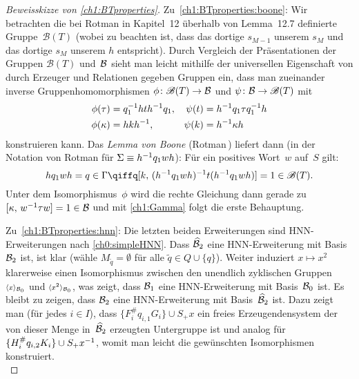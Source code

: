 \begin{proof}[Beweisskizze von \cref{ch1:BTproperties}]
    Zu~\ref{ch1:BTproperties:boone}: Wir betrachten die bei Rotman 
    in Kapitel~12 überhalb von Lemma~12.7 definierte Gruppe~$\mathscr{B}(T)$
    (wobei zu beachten ist, dass das dortige $s_{M-1}$ unserem $s_M$
    und das dortige $s_M$ unserem $h$ entspricht).
    Durch Vergleich der Präsentationen der Gruppen $\mathscr{B}(T)$
    und~$\mathcal{B}$ sieht man leicht mithilfe der universellen Eigenschaft
    von durch Erzeuger und Relationen gegeben Gruppen ein, dass man
    zueinander inverse Gruppenhomomorphismen $\phi\colon\mathscr{B}(T)
    \to\mathcal{B}$ und $\psi\colon\mathcal{B}\to\mathscr{B}(T)$ mit
    \begin{align*}
        \phi(\tau)   &= q_1^{-1} hth^{-1} q_1
        ,&
        \psi(t)      &= h^{-1} q_1\tau q_1^{-1} h
        \\
        \phi(\kappa) &= hkh^{-1}
        ,&
        \psi(k)      &= h^{-1}\kappa h
    \end{align*}
    konstruieren kann. Das \emph{Lemma von Boone}
    (Rotman\,\cite[Lemma~12.7]{bookc:rotman95}) liefert dann
    (in der Notation von Rotman für $\Sigma \equiv h^{-1} q_1wh$):
    Für ein positives Wort~$w$ auf~$S$ gilt:
    \[ hq_1wh = q \in\Gamma
        \qiffq
        \cu[k, (h\inv q_1wh)\inv t (h\inv q_1wh)] = 1
        \in\mathscr{B}(T)
    . \]
    Unter dem Isomorphismus~$\phi$ wird die rechte Gleichung
    dann gerade zu $\cu[\kappa, w\inv\tau w] = 1 \in\BT$
    und mit \cref{ch1:Gamma} folgt die erste Behauptung.
    
    Zu~\ref{ch1:BTproperties:hnn}: Die letzten beiden Erweiterungen
    sind HNN-Erweiterungen nach \cref{ch0:simpleHNN}. Dass $\widehat{\mathcal{B}}_2$
    eine HNN-Erweiterung mit Basis~$\mathcal{B}_2$ ist, ist klar (wähle
    $M_{\tilde q} = \emptyset$ für alle $\tilde q\in Q\cup\{q\}$).
    Weiter induziert $x\mapsto x^2$ klarerweise einen Isomorphismus
    zwischen den unendlich zyklischen Gruppen $\scriptstyle\langle x\rangle_{\mathcal{B}_0}$
    und $\scriptstyle\langle x^2\rangle_{\mathcal{B}_0}$, was zeigt, dass $\mathcal{B}_1$ eine
    HNN-Erweiterung mit Basis~$\mathcal{B}_0$ ist. Es bleibt zu zeigen,
    dass $\mathcal{B}_2$ eine HNN-Erweiterung mit Basis~$\widehat{\mathcal{B}}_2$ ist.
    Dazu zeigt man (für jedes $i\in I$), dass $\{F_i^\#q_{i,1}G_i\}\cup
    S_+x$ ein freies Erzeugendensystem der von dieser Menge
    in~$\widehat{\mathcal{B}}_2$ erzeugten Untergruppe ist und analog für
    $\{H_i^\#q_{i,2}K_i\}\cup S_+x^{-1}$, womit man leicht die
    gewünschten Isomorphismen konstruiert. 
    \\
\end{proof}

